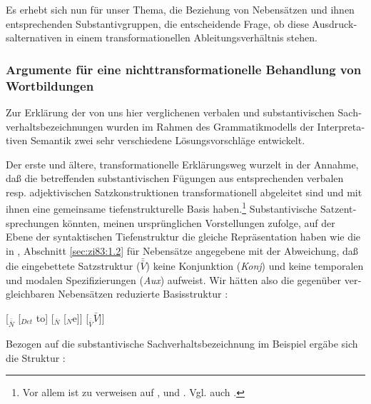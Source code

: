 \documentclass[output=paper]{langscibook}
\begin{document}
\begin{otherlanguage}{german}
Es erhebt sich nun für unser Thema, die Beziehung von Nebensätzen und ihnen entsprechenden Substantivgruppen, die entscheidende Frage, ob diese Aus\-drucks\-al\-ter\-na\-ti\-ven in einem transformationellen Ableitungsverhältnis stehen.

\subsubsection{Argumente für eine nichttransformationelle Behandlung von Wortbildungen} \label{sec:zi83:1.3.3}

Zur Erklärung der von uns hier verglichenen verbalen und substantivischen Sachverhaltsbezeichnungen wurden im Rahmen des Grammatikmodells der Interpretativen Semantik zwei sehr verschiedene Lösungsvorschläge entwickelt.

Der erste und ältere, transformationelle Erklärungsweg wurzelt in der Annahme, daß die betreffenden substantivischen Fügungen aus entsprechenden verbalen resp. adjektivischen Satzkonstruktionen transformationell abgeleitet sind und mit ihnen eine gemeinsame tiefenstrukturelle Basis haben.\footnote{Vor allem ist zu verweisen auf \citet{lees1960the-grammar-of-english-nominalizations-supplement-to-international-journal-of-american-linguistics-26}, \citet{vendler1964nominalizations} und \citet{hartung1964die-zusammengesetzten-satze-im-deutschen}. Vgl. auch \citet{zimmermann1967der-parallelismus-verbaler-und-substantivischer-konstruktionen-in-der-russischen-sprache-der-gegenwart, Zimmermann72Die-substantivische}.} Substanti\-vische Satzentsprechungen könnten, meinen ur\-sprüng\-li\-chen Vorstellungen zufolge, auf der Ebene der syntaktischen Tiefenstruktur die gleiche Repräsentation haben wie die in , Abschnitt \ref{sec:zi83:1.2} für Nebensätze angegebene mit der Abweichung, daß die eingebettete Satzstruktur ($\bar{\bar{V}}$) keine Konjunktion (\textit{Konj}) und keine temporalen und modalen Spezifizierungen (\textit{Aux}) aufweist. Wir hätten also die gegenüber vergleichbaren Nebensätzen reduzierte Basisstruktur%
:

\begin{exe}
     \label{ex:zi83:5'} [$_{\bar{\bar{N}}}$ [$_{Det}$ to] [$_{\bar{N}}$ [$_{N}$e]] [$_{\bar{\bar{V}}} \bar{V}$]]
\end{exe}

\noindent Bezogen auf die substantivische Sachverhaltsbezeichnung im Beispiel  ergäbe sich die Struktur :


\end{otherlanguage}
\end{document}
